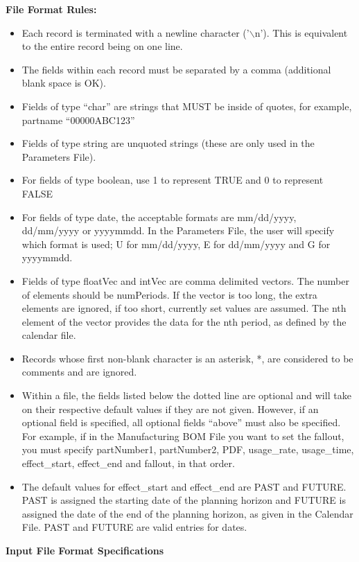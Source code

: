\noindent
{\bf File Format Rules:}
\begin{itemize}
\item Each record is terminated with a newline character ('$\backslash$n').  This is
  equivalent to the entire record being on one line.
\item The fields within each record must be separated by a comma (additional
  blank space is OK).
\item Fields of type ``char'' are strings that MUST be inside of quotes, for example,
  partname ``00000ABC123''
\item Fields of type string are unquoted strings (these are only used
  in the Parameters File).
\item For fields of type boolean, use 1 to represent TRUE and 0 to
  represent FALSE
\item For fields of type date, the acceptable formats are mm/dd/yyyy, 
  dd/mm/yyyy or yyyymmdd.  In the Parameters File, the user will specify which
  format is used;  U for mm/dd/yyyy, E for dd/mm/yyyy and G for yyyymmdd.
\item Fields of type floatVec and intVec are comma delimited vectors.
  The number of elements should be numPeriods.  If the vector is too
  long, the extra elements are ignored, if too short,  currently set
  values are assumed.  The nth element of the vector provides the
  data for the nth period, as defined by the calendar file.
\item Records whose first non-blank character is an asterisk, *, are 
  considered to be comments and are ignored.
\item Within a file, the fields listed below the dotted line are optional and
 will take on their respective default values if they are not given.  However,
 if an optional field is specified, all optional fields ``above'' must also be
 specified.  For example, if in the Manufacturing BOM File you want to set the
 fallout, you must specify partNumber1, partNumber2, PDF, usage\_rate, 
 usage\_time, effect\_start, effect\_end and fallout, in that order.
\item The default values for effect\_start and effect\_end are PAST and FUTURE.
PAST is assigned the starting date of the planning horizon
and FUTURE is assigned the date of the end of the 
planning horizon, as given in the Calendar File.  PAST and FUTURE are valid entries
for dates.
\end{itemize}

\clearpage
\noindent
{\bf Input File Format Specifications}

